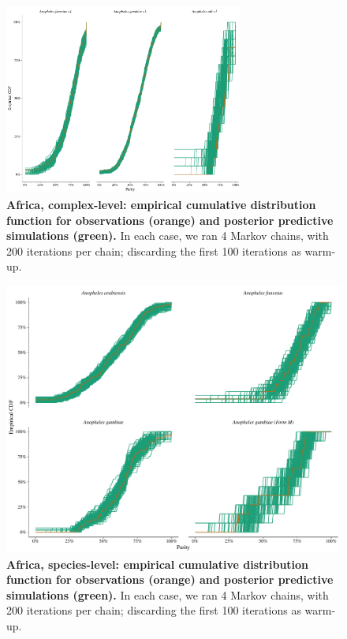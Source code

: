 \documentclass[12pt]{article}
\begin{document}
{\begin{figure}[ht]
	\centerline{\includegraphics[width=0.7\textwidth]{./Figure_files/detinova_ecdf_africa_grouped.pdf}}
	\caption{\textbf{Africa, complex-level: empirical cumulative distribution function for observations (orange) and posterior predictive simulations (green).} In each case, we ran 4 Markov chains, with 200 iterations per chain; discarding the first 100 iterations as warm-up.}\label{fig:detinova_ecdf_africa_grouped}
\end{figure}

\begin{figure}[ht]
	\centerline{\includegraphics[width=1\textwidth]{./Figure_files/detinova_ecdf_africa_species.pdf}}
	\caption{\textbf{Africa, species-level: empirical cumulative distribution function for observations (orange) and posterior predictive simulations (green).} In each case, we ran 4 Markov chains, with 200 iterations per chain; discarding the first 100 iterations as warm-up.}\label{fig:detinova_ecdf_africa_species}
\end{figure}

}
\end{document}
